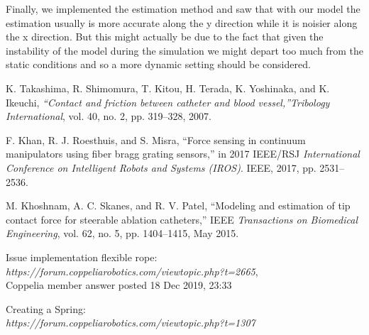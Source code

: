 \documentclass[conference,12pt]{IEEEtran}
\begin{document}
Finally, we implemented the estimation method and saw that with our model the estimation usually is more accurate along the y direction while it is noisier along the x direction. But this might actually be due to the fact that given the instability of the model during the simulation we might depart too much from the static conditions and so a more dynamic setting should be considered. 

\begin{thebibliography}{9}

K. Takashima, R. Shimomura, T. Kitou, H. Terada, K. Yoshinaka, and
K. Ikeuchi, \textit{“Contact and friction between catheter and blood vessel,”Tribology International}, vol. 40, no. 2, pp. 319–328, 2007.

F. Khan, R. J. Roesthuis, and S. Misra, “Force sensing in continuum manipulators using fiber bragg grating sensors,” in 2017 IEEE/RSJ \textit{International
Conference on Intelligent Robots and Systems (IROS)}. IEEE, 2017, pp. 2531–
2536.

M. Khoshnam, A. C. Skanes, and R. V. Patel, “Modeling and estimation of tip
contact force for steerable ablation catheters,” IEEE \textit{Transactions on Biomedical
Engineering}, vol. 62, no. 5, pp. 1404–1415, May 2015.

Issue implementation flexible rope:
\\\textit{https://forum.coppeliarobotics.com/viewtopic.php?t=2665},
\\Coppelia member answer posted 18 Dec 2019, 23:33

Creating a Spring:
\\\textit{https://forum.coppeliarobotics.com/viewtopic.php?t=1307}

\end{thebibliography}
\end{document}
